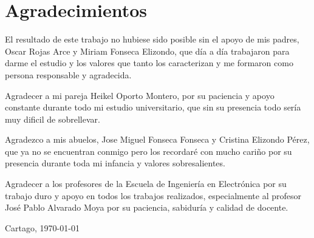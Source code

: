 \chapter*{Agradecimientos}
\thispagestyle{empty}

El resultado de este trabajo no hubiese sido posible sin el apoyo de mis padres, Oscar Rojas Arce y Miriam Fonseca Elizondo, que día a día trabajaron para darme el estudio y los valores que tanto los caracterizan y me formaron como persona responsable y agradecida.

Agradecer a mi pareja Heikel Oporto Montero, por su paciencia y apoyo constante durante todo mi estudio universitario, que sin su presencia todo sería muy dificil de sobrellevar.

Agradezco a mis abuelos, Jose Miguel Fonseca Fonseca y Cristina Elizondo Pérez, que ya no se encuentran conmigo pero los recordaré con mucho cariño por su presencia durante toda mi infancia y valores sobresalientes.

Agradecer a los profesores de la Escuela de Ingeniería en Electrónica por su trabajo duro y apoyo en todos los trabajos realizados, especialmente al profesor José Pablo Alvarado Moya por su paciencia, sabiduría y calidad de docente.

\vspace*{1cm}

\thesisAuthor

Cartago, \today

\cleardoublepage

